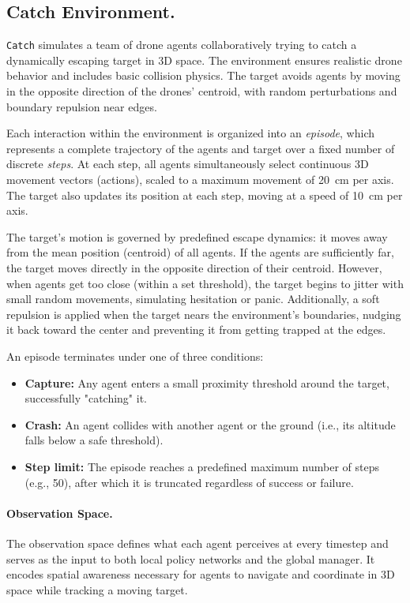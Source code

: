 \documentclass[12pt,a4paper,twoside,openany]{book}
\begin{document}
\subsection{Catch Environment.}
\texttt{Catch} simulates a team of drone agents collaboratively trying to catch a dynamically escaping target in 3D space. The environment ensures realistic drone behavior and includes basic collision physics. The target avoids agents by moving in the opposite direction of the drones' centroid, with random perturbations and boundary repulsion near edges.

Each interaction within the environment is organized into an \textit{episode}, which represents a complete trajectory of the agents and target over a fixed number of discrete \textit{steps}. At each step, all agents simultaneously select continuous 3D movement vectors (actions), scaled to a maximum movement of 20~cm per axis. The target also updates its position at each step, moving at a speed of 10~cm per axis.

The target's motion is governed by predefined escape dynamics: it moves away from the mean position (centroid) of all agents. If the agents are sufficiently far, the target moves directly in the opposite direction of their centroid. However, when agents get too close (within a set threshold), the target begins to jitter with small random movements, simulating hesitation or panic. Additionally, a soft repulsion is applied when the target nears the environment’s boundaries, nudging it back toward the center and preventing it from getting trapped at the edges.

An episode terminates under one of three conditions:
\begin{itemize}
    \item \textbf{Capture:} Any agent enters a small proximity threshold around the target, successfully "catching" it.
    \item \textbf{Crash:} An agent collides with another agent or the ground (i.e., its altitude falls below a safe threshold).
    \item \textbf{Step limit:} The episode reaches a predefined maximum number of steps (e.g., 50), after which it is truncated regardless of success or failure.
\end{itemize}

\paragraph{Observation Space.}
The observation space defines what each agent perceives at every timestep and serves as the input to both local policy networks and the global manager. It encodes spatial awareness necessary for agents to navigate and coordinate in 3D space while tracking a moving target.
\end{document}
